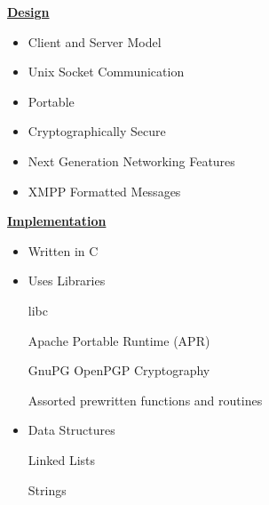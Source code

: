 \documentclass[a4,12pt]{seminar}
\newcommand{\SlideTitle}[1]{\Large \underline{\textbf{#1}}\normalsize}
\begin{document}
\begin{slide}{\SlideTitle{Design}}

\begin{itemize}

\item Client and Server Model

\item Unix Socket Communication

\item Portable

\item Cryptographically Secure

\item Next Generation Networking Features

\item XMPP Formatted Messages

\end{itemize}

\vfill

\end{slide}


\begin{slide}{\SlideTitle{Implementation}}

\begin{itemize}

\item Written in C

\item Uses Libraries

\subitem libc

\subitem Apache Portable Runtime (APR)

\subitem GnuPG OpenPGP Cryptography

\subitem Assorted prewritten functions and routines

\item Data Structures

\subitem Linked Lists

\subitem Strings

\end{itemize}

\vfill

\end{slide}
\end{document}
